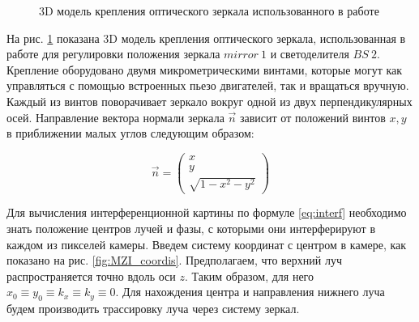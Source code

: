 \begin{figure}[ht]
\caption{3D модель крепления оптического зеркала использованного в работе \cite{newport_mirror}}
\label{fig:mirror}
\end{figure}

На рис. \ref{fig:mirror} показана 3D модель крепления оптического зеркала, использованная в работе для регулировки положения зеркала $mirror\ 1$ и светоделителя $BS\ 2$. Крепление оборудовано двумя микрометрическими винтами, которые могут как управляться с помощью встроенных пьезо двигателей, так и вращаться вручную. Каждый из винтов поворачивает зеркало вокруг одной из двух перпендикулярных осей. Направление вектора нормали зеркала $\vec{n}$ зависит от положений винтов $x, y$ в приближении малых углов следующим образом: 

\begin{equation}
    \vec{n} = \begin{pmatrix}
        x\\ 
        y\\ 
        \sqrt{1 - x^2 - y^2}
    \end{pmatrix}
\end{equation}


Для вычисления интерференционной картины по формуле \eqref{eq:interf} необходимо знать положение центров лучей и фазы, с которыми они интерферируют в каждом из пикселей камеры. Введем систему координат с центром в камере, как показано на рис. \ref{fig:MZI_coordis}. Предполагаем, что верхний луч распространяется точно вдоль оси  $z$. Таким образом, для него $x_0\equiv y_0\equiv k_x\equiv k_y\equiv 0$. Для нахождения центра и направления нижнего луча будем производить трассировку  луча через систему зеркал. 

